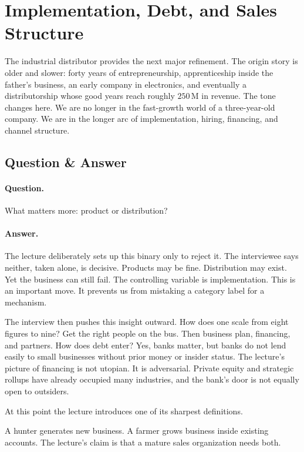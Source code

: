 \section{Implementation, Debt, and Sales Structure}

The industrial distributor provides the next major refinement. The origin story is older and slower: forty years of entrepreneurship, apprenticeship inside the father's business, an early company in electronics, and eventually a distributorship whose good years reach roughly $250\,\mathrm{M}$ in revenue. The tone changes here. We are no longer in the fast-growth world of a three-year-old company. We are in the longer arc of implementation, hiring, financing, and channel structure.

\subsection{Question \& Answer}

\paragraph{Question.} What matters more: product or distribution?

\paragraph{Answer.} The lecture deliberately sets up this binary only to reject it. The interviewee says neither, taken alone, is decisive. Products may be fine. Distribution may exist. Yet the business can still fail. The controlling variable is implementation. This is an important move. It prevents us from mistaking a category label for a mechanism.

The interview then pushes this insight outward. How does one scale from eight figures to nine? Get the right people on the bus. Then business plan, financing, and partners. How does debt enter? Yes, banks matter, but banks do not lend easily to small businesses without prior money or insider status. The lecture's picture of financing is not utopian. It is adversarial. Private equity and strategic rollups have already occupied many industries, and the bank's door is not equally open to outsiders.

At this point the lecture introduces one of its sharpest definitions.

\begin{definition}
A hunter generates new business. A farmer grows business inside existing accounts. The lecture's claim is that a mature sales organization needs both.
\end{definition}

